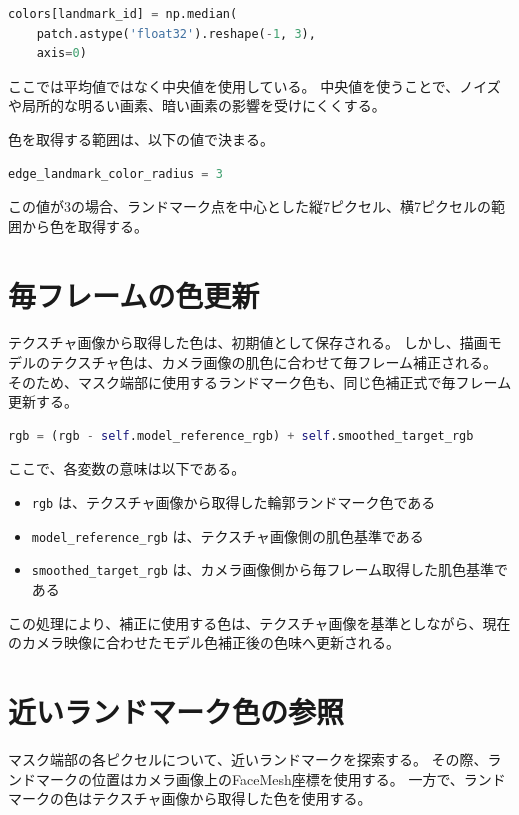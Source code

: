\documentclass[uplatex,dvipdfmx]{jsarticle}
\begin{document}
\begin{lstlisting}[language=Python]
colors[landmark_id] = np.median(
    patch.astype('float32').reshape(-1, 3),
    axis=0)
\end{lstlisting}

ここでは平均値ではなく中央値を使用している。
中央値を使うことで、ノイズや局所的な明るい画素、暗い画素の影響を受けにくくする。

色を取得する範囲は、以下の値で決まる。

\begin{lstlisting}[language=Python]
edge_landmark_color_radius = 3
\end{lstlisting}

この値が3の場合、ランドマーク点を中心とした縦7ピクセル、横7ピクセルの範囲から色を取得する。

\section{毎フレームの色更新}

テクスチャ画像から取得した色は、初期値として保存される。
しかし、描画モデルのテクスチャ色は、カメラ画像の肌色に合わせて毎フレーム補正される。
そのため、マスク端部に使用するランドマーク色も、同じ色補正式で毎フレーム更新する。

\begin{lstlisting}[language=Python]
rgb = (rgb - self.model_reference_rgb) + self.smoothed_target_rgb
\end{lstlisting}

ここで、各変数の意味は以下である。

\begin{itemize}
  \item \texttt{rgb} は、テクスチャ画像から取得した輪郭ランドマーク色である
  \item \texttt{model\_reference\_rgb} は、テクスチャ画像側の肌色基準である
  \item \texttt{smoothed\_target\_rgb} は、カメラ画像側から毎フレーム取得した肌色基準である
\end{itemize}

この処理により、補正に使用する色は、テクスチャ画像を基準としながら、現在のカメラ映像に合わせたモデル色補正後の色味へ更新される。

\section{近いランドマーク色の参照}

マスク端部の各ピクセルについて、近いランドマークを探索する。
その際、ランドマークの位置はカメラ画像上のFaceMesh座標を使用する。
一方で、ランドマークの色はテクスチャ画像から取得した色を使用する。
\end{document}
